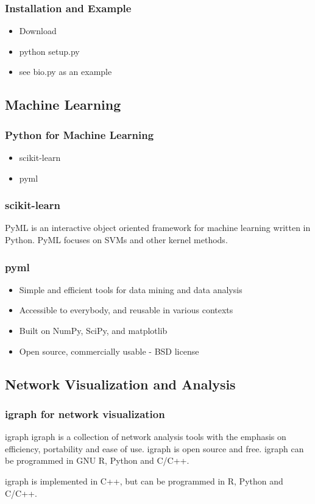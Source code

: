\documentclass[UTF8]{beamer}
\begin{document}
\begin{frame}
  \frametitle{Installation and Example}
  \begin{itemize}
    \item Download
    \item python setup.py
    \item see bio.py as an example
  \end{itemize}
\end{frame}


\subsection{Machine Learning}
\begin{frame}
  \frametitle{Python for Machine Learning}
  \begin{itemize}
    \item scikit-learn
    \item pyml
  \end{itemize}
\end{frame}

\begin{frame}
  \frametitle{scikit-learn}
  PyML is an interactive object oriented framework for machine learning written
   in Python. PyML focuses on SVMs and other kernel methods.
\end{frame}

\begin{frame}
  \frametitle{pyml}
  \begin{itemize}
    \item Simple and efficient tools for data mining and data analysis
    \item Accessible to everybody, and reusable in various contexts
    \item Built on NumPy, SciPy, and matplotlib
    \item Open source, commercially usable - BSD license
  \end{itemize}
\end{frame}

\subsection{Network Visualization and Analysis}
\begin{frame}
  \frametitle{igraph for network visualization}
  \begin{block}{igraph}
    igraph is a collection of network analysis tools with the emphasis on
    efficiency, portability and ease of use. igraph is open source and free.
    igraph can be programmed in GNU R, Python and C/C++.
  \end{block}

  igraph is implemented in C++, but can be programmed in R, Python and C/C++.
\end{frame}
\end{document}
